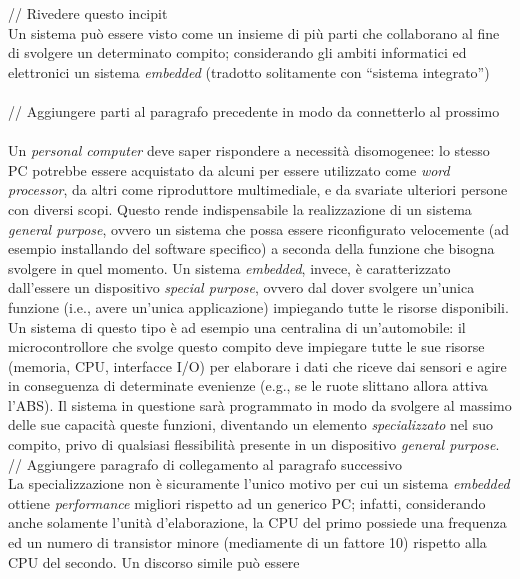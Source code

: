 // Rivedere questo incipit \\
Un sistema può essere visto come un insieme di più parti che collaborano al fine
di svolgere un determinato compito; considerando gli  ambiti informatici ed 
elettronici un sistema \emph{embedded} (tradotto solitamente con ``sistema 
integrato'')
 \\ \\
// Aggiungere parti al paragrafo precedente in modo da connetterlo al prossimo
 \\ \\
Un \emph{personal computer} deve saper rispondere a necessità disomogenee: 
lo stesso PC potrebbe essere acquistato da alcuni per essere utilizzato come 
\emph{word processor}, da altri come riproduttore multimediale, e da svariate 
ulteriori persone con diversi scopi. Questo rende indispensabile la 
realizzazione di un sistema \emph{general purpose}, ovvero un sistema che possa 
essere riconfigurato velocemente (ad esempio installando del software 
specifico) a seconda della funzione che bisogna svolgere in quel momento.
Un sistema \emph{embedded}, invece, è caratterizzato dall'essere un dispositivo 
\emph{special purpose}, ovvero dal dover svolgere un'unica funzione (i.e., 
avere un'unica applicazione) impiegando tutte le risorse disponibili.
Un sistema di questo tipo è ad esempio una centralina di un'automobile: il 
microcontrollore che svolge questo compito deve impiegare tutte le sue risorse 
(memoria, CPU, interfacce I/O) per elaborare i dati che riceve dai sensori e 
agire in conseguenza di determinate evenienze (e.g., se le ruote slittano 
allora attiva l'ABS). Il sistema in questione sarà programmato in modo da 
svolgere al massimo delle sue capacità queste funzioni, diventando un elemento 
\emph{specializzato} nel suo compito, privo di qualsiasi flessibilità presente 
in un dispositivo \emph{general purpose}.
\\ // Aggiungere paragrafo di collegamento al paragrafo successivo \\
La specializzazione non è sicuramente l'unico motivo per cui un sistema 
\emph{embedded} ottiene \emph{performance} migliori rispetto ad un generico PC; 
infatti, considerando anche solamente l'unità d'elaborazione, la CPU del primo 
possiede una frequenza ed un numero di transistor minore (mediamente di un 
fattore 10) rispetto alla CPU del secondo. Un discorso simile può essere 
